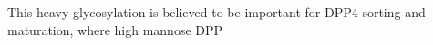 This heavy glycosylation is believed to be important for DPP4 sorting and maturation, where high mannose DPP\cite{Matter_1991}